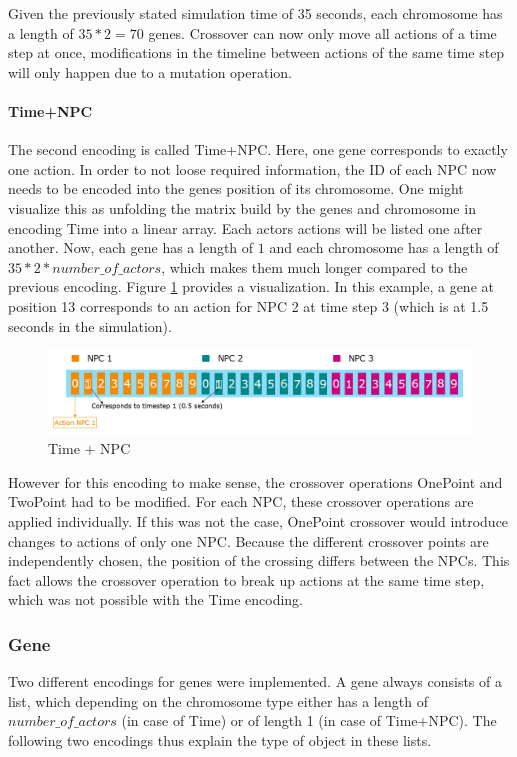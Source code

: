 Given the previously stated simulation time of 35 seconds, each chromosome has a length of $35 * 2 = 70$ genes.
Crossover can now only move all actions of a time step at once, modifications in the timeline between actions of the same time step will only happen due to a mutation operation.

\paragraph{Time+NPC}
The second encoding is called Time+NPC. Here, one gene corresponds to exactly one action. In order to not loose required information, the ID of each NPC now needs to be encoded into the genes position of its chromosome. One might visualize this as unfolding the matrix build by the genes and chromosome in encoding Time into a linear array. Each actors actions will be listed one after another. Now, each gene has a length of $1$ and each chromosome has a length of $35 * 2 * number\_of\_actors$, which makes them much longer compared to the previous encoding. Figure \ref{fig:implementation:encoding_chromosome_time_npc} provides a visualization. In this example, a gene at position 13 corresponds to an action for NPC 2 at time step 3 (which is at 1.5 seconds in the simulation).

\begin{figure}[ht] 
	\includegraphics[width=1\linewidth]{figures/time_npc_encoding}
	\caption{Time + NPC}
	\label{fig:implementation:encoding_chromosome_time_npc}
\end{figure}

However for this encoding to make sense, the crossover operations OnePoint and TwoPoint had to be modified. For each NPC, these crossover operations are applied individually. If this was not the case, OnePoint crossover would introduce changes to actions of only one NPC. Because the different crossover points are independently chosen, the position of the crossing differs between the NPCs. This fact allows the crossover operation to break up actions at the same time step, which was not possible with the Time encoding.

\subsubsection{Gene}
Two different encodings for genes were implemented. A gene always consists of a list, which depending on the chromosome type either has a length of $number\_of\_actors$ (in case of Time) or of length 1 (in case of Time+NPC). The following two encodings thus explain the type of object in these lists.

